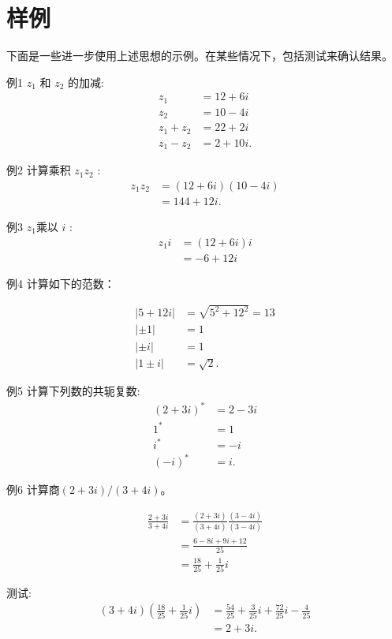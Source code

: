 \section{样例}
下面是一些进一步使用上述思想的示例。在某些情况下，包括测试来确认结果。

例1 $z_{1}$ 和 $z_{2}$ 的加减:
$$
\begin{aligned}
z_{1} & =12+6 i \\
z_{2} & =10-4 i \\
z_{1}+z_{2} & =22+2 i \\
z_{1}-z_{2} & =2+10 i .
\end{aligned}
$$

例2  计算乘积 $z_{1} z_{2}$ :
$$
\begin{aligned}
z_{1} z_{2} & =(12+6 i)(10-4 i) \\
& =144+12 i .
\end{aligned}
$$

例3 $z_{1}$乘以 $i$ :
$$
\begin{aligned}
z_{1} i & =(12+6 i) i \\
& =-6+12 i
\end{aligned}
$$

例4 计算如下的范数：

$$
\begin{aligned}
|5+12 i| & =\sqrt{5^{2}+12^{2}}=13 \\
|\pm 1| & =1 \\
|\pm i| & =1 \\
|1 \pm i| & =\sqrt{2} .
\end{aligned}
$$

例5 计算下列数的共轭复数:
$$
\begin{aligned}
(2+3 i)^{*} & =2-3 i \\
1^{*} & =1 \\
i^{*} & =-i \\
(-i)^{*} & =i .
\end{aligned}
$$

例6 计算商$(2+ 3i) /(3+ 4i)$。

$$
\begin{aligned}
\frac{2+3 i}{3+4 i} & =\frac{(2+3 i)}{(3+4 i)} \frac{(3-4 i)}{(3-4 i)} \\
& =\frac{6-8 i+9 i+12}{25} \\
& =\frac{18}{25}+\frac{1}{25} i
\end{aligned}
$$

测试:
$$
\begin{aligned}
(3+4 i)\left(\frac{18}{25}+\frac{1}{25} i\right) & =\frac{54}{25}+\frac{3}{25} i+\frac{72}{25} i-\frac{4}{25} \\
& =2+3 i .
\end{aligned}
$$

